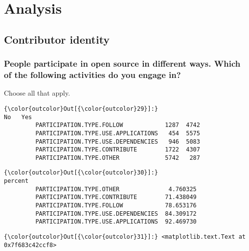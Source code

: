 \documentclass[11pt]{article}
\begin{document}
    \section{Analysis}\label{analysis}


    \subsection{Contributor identity}\label{contributor-identity}

    \subsubsection{People participate in open source in different ways.
Which of the following activities do you engage
in?}\label{people-participate-in-open-source-in-different-ways.-which-of-the-following-activities-do-you-engage-in}

Choose all that apply.


            \begin{Verbatim}[commandchars=\\\{\}]
{\color{outcolor}Out[{\color{outcolor}29}]:}                                        No   Yes
         PARTICIPATION.TYPE.FOLLOW            1287  4742
         PARTICIPATION.TYPE.USE.APPLICATIONS   454  5575
         PARTICIPATION.TYPE.USE.DEPENDENCIES   946  5083
         PARTICIPATION.TYPE.CONTRIBUTE        1722  4307
         PARTICIPATION.TYPE.OTHER             5742   287
\end{Verbatim}
        


            \begin{Verbatim}[commandchars=\\\{\}]
{\color{outcolor}Out[{\color{outcolor}30}]:}                                        percent
         PARTICIPATION.TYPE.OTHER              4.760325
         PARTICIPATION.TYPE.CONTRIBUTE        71.438049
         PARTICIPATION.TYPE.FOLLOW            78.653176
         PARTICIPATION.TYPE.USE.DEPENDENCIES  84.309172
         PARTICIPATION.TYPE.USE.APPLICATIONS  92.469730
\end{Verbatim}
        

            \begin{Verbatim}[commandchars=\\\{\}]
{\color{outcolor}Out[{\color{outcolor}31}]:} <matplotlib.text.Text at 0x7f683c42ccf8>
\end{Verbatim}
        
    \begin{center}
    \end{center}
    { \hspace*{\fill} \\}
    
\end{document}
